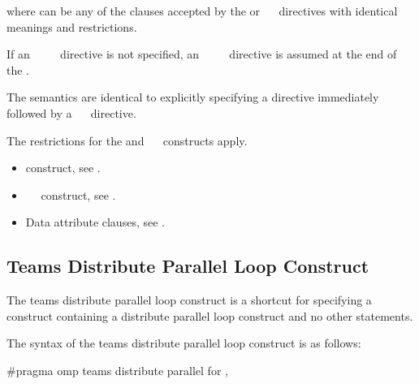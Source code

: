 where  can be any of the clauses accepted by the  or 
~~ directives with identical meanings and restrictions.

If an ~~~~ directive is not specified, an 
~~~~ directive is assumed at the end of the .
\fortranspecificend

\descr
The semantics are identical to explicitly specifying a  directive immediately 
followed by a ~~ directive.

\restrictions
The restrictions for the  and ~~ constructs apply.

\crossreferences
\begin{itemize}
\item {} construct, see 
.

\item {}~~ construct, see 
.

\item Data attribute clauses, see 
.
\end{itemize}











\subsection{Teams Distribute Parallel Loop Construct}
\label{subsec:Teams Distribute Parallel Loop Construct}
\summary
The teams distribute parallel loop construct is a shortcut for specifying a  
construct containing a distribute parallel loop construct and no other statements.

\syntax
\ccppspecificstart
The syntax of the teams distribute parallel loop construct is as follows:

\begin{boxedcode}
\#pragma omp teams distribute parallel for \plc{[clause[ [},\plc{] clause] ... ]}
\end{boxedcode}

